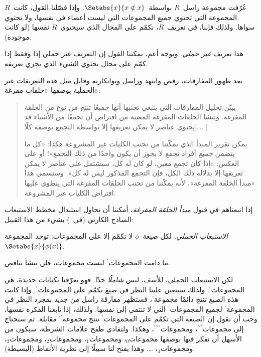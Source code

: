 \documentclass[../../../include/open-logic-section]{subfiles}
\begin{document}


عُرّفت مجموعة راسل~$R$ بواسطة~$\Setabs{x}{x \notin x}$. وإذا فصّلنا
القول، كانت~$R$ المجموعة التي تحتوي جميع المجموعات التي ليست أعضاء
في نفسها، ولا تحتوي سواها. ولذلك فإننا، في تعريف~$R$، نكمّم على المجال
الذي سيحتوي~$R$ نفسها (لو كانت موجودة).

هذا تعريف \emph{غير حملي}. وبوجه أعم، يمكننا القول إن التعريف غير حملي
إذا وفقط إذا كمّم على مجال يحتوي الشيء الذي يجري تعريفه.
	
بعد ظهور المفارقات، رفض وايتهد وراسل وبوانكاريه وفايل مثل هذه التعريفات
غير الحملية بوصفها «حلقات مفرغة»:
\begin{quote}
	يبيّن تحليل المفارقات التي ينبغي تجنبها أنها جميعًا تنتج من نوع من
	الحلقة المفرغة. وتنشأ الحلقات المفرغة المعنية من افتراض أن تجمعًا من
	الأشياء قد يحتوي عناصر لا يمكن تعريفها إلا بواسطة التجمع بوصفه
	كلًا[\ldots. \textparagraph]

	يمكن تقرير المبدأ الذي يمكّننا من تجنب الكليات غير المشروعة هكذا:
	«كل ما يتضمن \emph{جميع} أفراد تجمع لا يجوز أن يكون واحدًا من ذلك
	التجمع»؛ أو على العكس: «إذا كان تجمع معين، لو كان له كل، سيشتمل على
	عناصر لا يمكن تعريفها إلا بدلالة ذلك الكل، فإن التجمع المذكور ليس له
	كل». وسنسمي هذا «مبدأ الحلقة المفرغة»، لأنه يمكّننا من تجنب الحلقات
	المفرغة التي ينطوي عليها افتراض الكليات غير المشروعة.
	\citep[p.~37]{WhiteheadRussell1910}
\end{quote}
إذا اتبعناهم في قبول \emph{مبدأ الحلقة المفرغة}، أمكننا أن نحاول
استبدال مخطط الاستيعاب الساذج الكارثي
(في~) بشيء من هذا القبيل:

\begin{defish}
\emph{الاستيعاب الحملي.} لكل صيغة~$\phi$ لا تكمّم إلا على المجموعات:
توجد المجموعة$^\prime$~$\Setabs{x}{\phi(x)}$.
\end{defish}

ما دامت المجموعات$^{\prime}$ ليست مجموعات، فلن ينشأ تناقض.

لكن الاستيعاب الحملي، للأسف، ليس \emph{شاملًا} جدًا. فهو يعرّفنا
بكيانات جديدة، هي المجموعات$^\prime$. ولذلك سيتعين علينا النظر في صيغ
تكمّم على المجموعات$^\prime$. وإذا كانت هذه الصيغ تنتج دائمًا
مجموعة$^\prime$، فستظهر مفارقة راسل من جديد بمجرد النظر في
المجموعة$^\prime$ لجميع المجموعات$^\prime$ التي لا تنتمي إلى نفسها.
ولذلك، إذا تابعنا الفكرة نفسها، وجب أن نقول إن الصيغة التي تكمّم على
المجموعات$^\prime$ تنتج مجموعة$^{\prime\prime}$ مقابلة. ثم سنحتاج إلى
مجموعات$^{\prime\prime\prime}$، ومجموعات$^{\prime\prime\prime\prime}$،
وهكذا. ولتفادي طفح علامات الشرطة، سيكون من الأسهل أن نفكر فيها بوصفها
مجموعات$_0$، ومجموعات$_1$، ومجموعات$_2$، ومجموعات$_3$،
ومجموعات$_4$، \ldots. وهذا يفتح لنا سبيلًا إلى نظرية الأنماط
(البسيطة).
\end{document}
